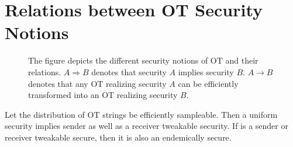 \section{Relations between OT Security Notions}


\begin{figure}[h!]
\centering
{}
\label{fig:OTrelations}
\caption{
The figure depicts the different security notions of OT and their relations. $A\Rightarrow B$ denotes that security $A$ implies security $B$. $A\rightarrow B$ denotes that any OT realizing security $A$ can be efficiently transformed into an OT realizing security $B$.
}
\end{figure}

\begin{lemma}
Let the distribution of OT strings be efficiently sampleable. 
Then a uniform security implies sender as well as a receiver tweakable security. If \OT is a sender or receiver tweakable secure, then it is also an endemically secure.
\end{lemma}

